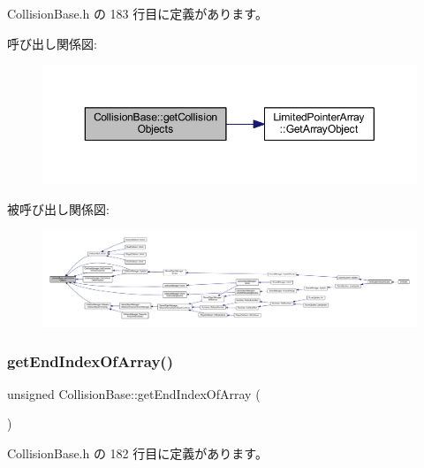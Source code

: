 Collision\+Base.\+h の 183 行目に定義があります。

呼び出し関係図\+:\nopagebreak
\begin{figure}[H]
\begin{center}
\leavevmode
\includegraphics[width=350pt]{class_collision_base_a2e54e04c6ebd809ac2bc955083fec61c_cgraph}
\end{center}
\end{figure}
被呼び出し関係図\+:
\nopagebreak
\begin{figure}[H]
\begin{center}
\leavevmode
\includegraphics[width=350pt]{class_collision_base_a2e54e04c6ebd809ac2bc955083fec61c_icgraph}
\end{center}
\end{figure}
\mbox{\label{class_collision_base_ac1d7000c820fabfa604138cda30a40a1}} 
\subsubsection{\texorpdfstring{get\+End\+Index\+Of\+Array()}{getEndIndexOfArray()}}
{\footnotesize\ttfamily unsigned Collision\+Base\+::get\+End\+Index\+Of\+Array (\begin{DoxyParamCaption}{ }\end{DoxyParamCaption})\hspace{0.3cm}{\ttfamily [inline]}}



 Collision\+Base.\+h の 182 行目に定義があります。

